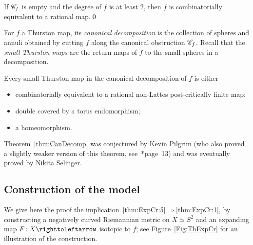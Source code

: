\documentclass{amsart}
\newcommand\phantombullet[1]{\makebox[0mm][r]{#1\phantom{$\bullet$}\quad}}
\begin{document}
\begin{thm}\label{th:kevin_can_obstr}
  If ${\mathscr C}_f$ is empty and the degree of $f$ is at least $2$, then $f$
  is combinatorially equivalent to a rational map.\qed
\end{thm}

For $f$ a Thurston map, its \emph{canonical decomposition} is the
collection of spheres and annuli obtained by cutting $f$ along the
canonical obstruction ${\mathscr C}_f$. Recall that the \emph{small Thurston
  maps} are the return maps of $f$ to the small spheres in a
decomposition.

\begin{thm}\label{thm:CanDecomp}
  Every small Thurston map in the canonical decomposition of $f$ is
  either
  \begin{itemize}
  \item combinatorially equivalent to a rational non-Lattes
    post-critically finite map;
  \item double covered by a torus endomorphism;
  \item \phantombullet{or}a homeomorphism.
  \end{itemize}
\end{thm}
Theorem~\ref{thm:CanDecomp} was conjectured by Kevin Pilgrim (who also
proved a slightly weaker version of this theorem,
see~\cite{pilgrim:combinations}*{page~13}) and was eventually proved
by Nikita Selinger.

\subsection{Construction of the model}\label{subsec:ProofOfThmExpCrMain}
We give here the proof the
implication~\eqref{thm:ExpCr:5}$\Rightarrow$\eqref{thm:ExpCr:1}, by
constructing a negatively curved Riemannian metric on $X\simeq S^2$
and an expanding map $F\colon X\selfmap$ isotopic to $f$; see
Figure~\ref{Fig:ThExpCr} for an illustration of the
construction.
\end{document}
